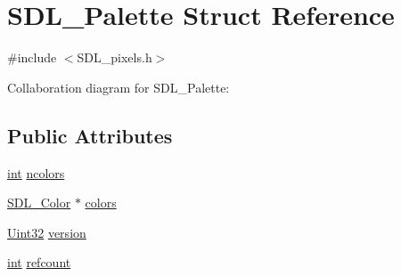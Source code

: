 \hypertarget{struct_s_d_l___palette}{\section{S\-D\-L\-\_\-\-Palette Struct Reference}
\label{struct_s_d_l___palette}
}


{\ttfamily \#include $<$S\-D\-L\-\_\-pixels.\-h$>$}



Collaboration diagram for S\-D\-L\-\_\-\-Palette\-:
\subsection*{Public Attributes}
\begin{DoxyCompactItemize}
\item 
\hyperlink{_s_d_l__thread_8h_a6a64f9be4433e4de6e2f2f548cf3c08e}{int} \hyperlink{struct_s_d_l___palette_a81a0cc3197480e994c6b06f1f0567091}{ncolors}
\item 
\hyperlink{struct_s_d_l___color}{S\-D\-L\-\_\-\-Color} $\ast$ \hyperlink{struct_s_d_l___palette_ad757a50037f43533196e94942440b241}{colors}
\item 
\hyperlink{_s_d_l__stdinc_8h_add440eff171ea5f55cb00c4a9ab8672d}{Uint32} \hyperlink{struct_s_d_l___palette_a5b8d45519f6850a32f13f1602ce37a8e}{version}
\item 
\hyperlink{_s_d_l__thread_8h_a6a64f9be4433e4de6e2f2f548cf3c08e}{int} \hyperlink{struct_s_d_l___palette_a35c667737f883f973bb0a8dea143b08d}{refcount}
\end{DoxyCompactItemize}


